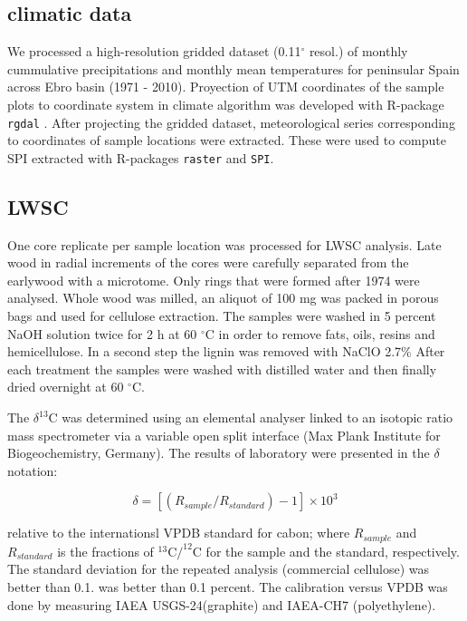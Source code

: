 \documentclass[review,authoryear]{elsarticle}
\begin{document}
\subsection{climatic data}
We processed a high-resolution gridded dataset (0.11$^{\circ}$ resol.)
of monthly cummulative precipitations and monthly mean temperatures
for peninsular Spain \citep[~Spain02]{Herrera2015} across Ebro basin
(1971 - 2010). Proyection of UTM coordinates of the sample plots to
coordinate system in climate algorithm was developed with R-package
{\tt rgdal} \citep{Bivand2015}. After projecting the gridded dataset,
meteorological series corresponding to coordinates of sample locations
were extracted. These were used to compute \gls{SPI} extracted with
R-packages {\tt raster} \citep{Hijmans2015} and {\tt SPI}.

\subsection{\acrlong{LWSC}}
One core replicate per sample location was processed for \gls{LWSC}
analysis. Late wood in radial increments
of the cores were carefully separated from the earlywood with a
microtome. Only rings that were formed after 1974 were analysed. Whole
wood was milled, an aliquot of 100 mg was packed in porous bags and
used for cellulose extraction. The samples were washed in 5 percent
NaOH solution twice for 2 h at 60 $^{\circ}$C in order to remove fats,
oils, resins and hemicellulose. In a second step the lignin was
removed with NaClO 2.7\% After each treatment the samples were washed
with distilled water and then finally dried overnight at 60
$^{\circ}$C.

The $\delta^{13}$C was determined using an elemental analyser linked
to an isotopic ratio mass spectrometer via a variable open split
interface (Max Plank Institute for Biogeochemistry, Germany). The
results of laboratory were presented in the $\delta$ notation:

\begin{equation}\label{eq:dC}
\delta = \left [ \left ( R_{sample}/R_{standard} \right )-1 \right ]\times 10^3 
\end{equation}

relative to the internationsl VPDB standard for cabon; where
$R_{sample}$ and $R_{standard}$ is the fractions of $^{13}$C$/^{12}$C
for the sample and the standard, respectively. The standard deviation
for the repeated analysis (commercial cellulose) was better than
0.1. was better than 0.1 percent. The calibration versus VPDB was done
by measuring IAEA USGS-24(graphite) and IAEA-CH7 (polyethylene).
\end{document}
